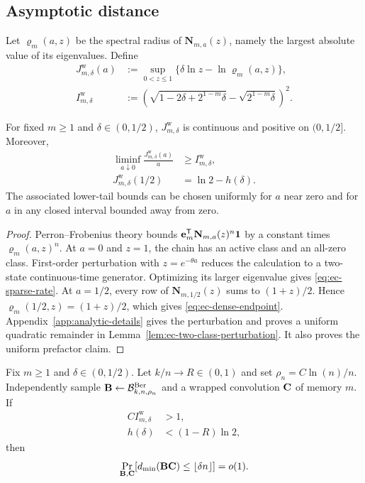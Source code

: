 \subsection{Asymptotic distance}

Let $\varrho_m(a,z)$ be the spectral radius of
$\mathbf N_{m,a}(z)$, namely the largest absolute value of its eigenvalues.
Define
\begin{align}
 J^{\mathrm w}_{m,\delta}(a)
 &:=\sup_{0<z\leq1}
 \{\delta\ln z-\ln\varrho_m(a,z)\},
 \label{eq:ec-rate-function}\\
 I^{\mathrm w}_{m,\delta}
 &:=\left(
 \sqrt{1-2\delta+2^{1-m}\delta}
 -\sqrt{2^{1-m}\delta}
 \right)^2.
 \label{eq:ec-sparse-rate}
\end{align}

\begin{lemma}
\label{lem:ec-endpoints}
For fixed $m\geq1$ and $\delta\in(0,1/2)$,
$J^{\mathrm w}_{m,\delta}$ is continuous and positive on $(0,1/2]$.
Moreover,
\begin{align}
 \liminf_{a\downarrow0}
 \frac{J^{\mathrm w}_{m,\delta}(a)}a
 &\geq I^{\mathrm w}_{m,\delta},
 \label{eq:ec-sparse-endpoint}\\
 J^{\mathrm w}_{m,\delta}(1/2)
 &=\ln2-h(\delta).
 \label{eq:ec-dense-endpoint}
\end{align}
The associated lower-tail bounds can be chosen uniformly for $a$ near zero
and for $a$ in any closed interval bounded away from zero.
\end{lemma}

\begin{proof}
Perron--Frobenius theory bounds
$\mathbf e_m^{\mathsf T}\mathbf N_{m,a}(z)^n\mathbf 1$ by a constant times
$\varrho_m(a,z)^n$.  At $a=0$ and $z=1$, the chain has an active class and an
all-zero class.  First-order perturbation with $z=e^{-\theta a}$ reduces the
calculation to a two-state continuous-time generator.  Optimizing its larger
eigenvalue gives \eqref{eq:ec-sparse-rate}.  At $a=1/2$, every row of
$\mathbf N_{m,1/2}(z)$ sums to $(1+z)/2$.  Hence
$\varrho_m(1/2,z)=(1+z)/2$, which gives
\eqref{eq:ec-dense-endpoint}.  Appendix~\ref{app:analytic-details} gives the
perturbation and proves a uniform quadratic remainder in
Lemma~\ref{lem:ec-two-class-perturbation}.  It also proves the uniform
prefactor claim.
\end{proof}

\begin{theorem}
\label{thm:ec-distance}
Fix $m\geq1$ and $\delta\in(0,1/2)$.  Let $k/n\to R\in(0,1)$ and set
$\rho_n=C\ln(n)/n$.  Independently sample
$\mathbf B\gets\mathcal B^{\mathrm{Ber}}_{k,n,\rho_n}$ and a wrapped convolution
$\mathbf C$ of memory $m$.  If
\begin{align}
 C I^{\mathrm w}_{m,\delta}&>1,
 \label{eq:ec-sparse-condition}\\
 h(\delta)&<(1-R)\ln2,
 \label{eq:ec-gv-condition}
\end{align}
then
\begin{equation}
 \Pr_{\mathbf B,\mathbf C}[d_{\min}(\mathbf B\mathbf C)\leq\lfloor\delta n\rfloor]=o(1).
 \label{eq:ec-distance-conclusion}
\end{equation}
\end{theorem}

